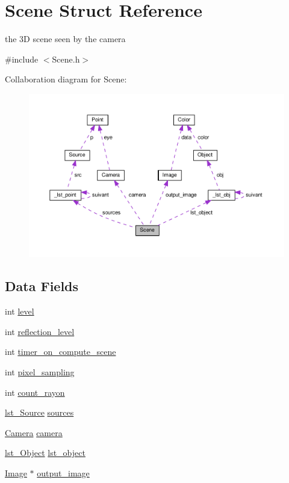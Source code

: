 \hypertarget{struct_scene}{}\section{Scene Struct Reference}
\label{struct_scene}


the 3D scene seen by the camera  




{\ttfamily \#include $<$Scene.\+h$>$}



Collaboration diagram for Scene\+:\nopagebreak
\begin{figure}[H]
\begin{center}
\leavevmode
\includegraphics[width=350pt]{struct_scene__coll__graph}
\end{center}
\end{figure}
\subsection*{Data Fields}
\begin{DoxyCompactItemize}
\item 
int \hyperlink{struct_scene_acf4d33ee4cff36f69b924471174dcb11}{level}
\item 
int \hyperlink{struct_scene_ab42fe399d3a5afbb011869e914bdb51e}{reflection\+\_\+level}
\item 
int \hyperlink{struct_scene_a55a22286c25bb0d604e9425da1c0c121}{timer\+\_\+on\+\_\+compute\+\_\+scene}
\item 
int \hyperlink{struct_scene_ad7146066ca84f44322c4b8b9b0cf68b3}{pixel\+\_\+sampling}
\item 
int \hyperlink{struct_scene_a413744f68ce61704d543f5a8920f0d49}{count\+\_\+rayon}
\item 
\hyperlink{structlst___source}{lst\+\_\+\+Source} \hyperlink{struct_scene_af2cbe3867b855ed9935538ebfffe3a6f}{sources}
\item 
\hyperlink{struct_camera}{Camera} \hyperlink{struct_scene_a2008f4ab70b5e4104c2ca43932536ddf}{camera}
\item 
\hyperlink{structlst___object}{lst\+\_\+\+Object} \hyperlink{struct_scene_ad1a9dde1f53b5136da8ba5fd10417eb5}{lst\+\_\+object}
\item 
\hyperlink{struct_image}{Image} $\ast$ \hyperlink{struct_scene_a00c31761980e6dadd21455e3f21926da}{output\+\_\+image}
\end{DoxyCompactItemize}


